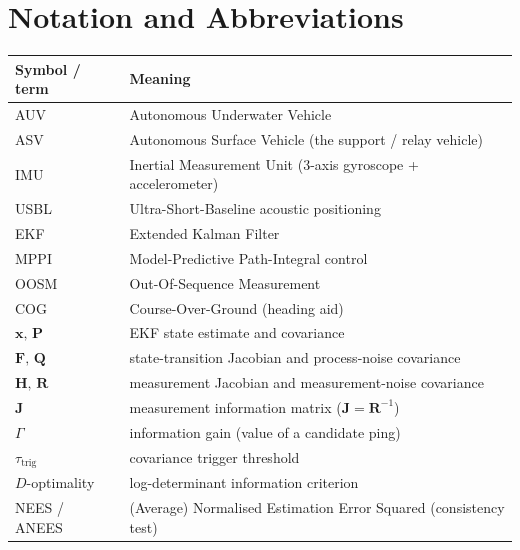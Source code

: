 \documentclass[12pt,a4paper,oneside]{book}
\begin{document}
{\hypersetup{linkcolor=black} \tableofcontents}
{\hypersetup{linkcolor=black} \listoffigures}
{\hypersetup{linkcolor=black} \listoftables}

\chapter*{\centering Notation and Abbreviations}
\begin{center}
\begin{tabular}{@{}ll@{}}
\toprule
Symbol / term & Meaning \\
\midrule
AUV & Autonomous Underwater Vehicle \\
ASV & Autonomous Surface Vehicle (the support / relay vehicle) \\
IMU & Inertial Measurement Unit (3-axis gyroscope + accelerometer) \\
USBL & Ultra-Short-Baseline acoustic positioning \\
EKF & Extended Kalman Filter \\
MPPI & Model-Predictive Path-Integral control \\
OOSM & Out-Of-Sequence Measurement \\
COG & Course-Over-Ground (heading aid) \\
$\mathbf{x},\,\mathbf{P}$ & EKF state estimate and covariance \\
$\mathbf{F},\,\mathbf{Q}$ & state-transition Jacobian and process-noise covariance \\
$\mathbf{H},\,\mathbf{R}$ & measurement Jacobian and measurement-noise covariance \\
$\mathbf{J}$ & measurement information matrix ($\mathbf{J}=\mathbf{R}^{-1}$) \\
$\Gamma$ & information gain (value of a candidate ping) \\
$\tau_{\text{trig}}$ & covariance trigger threshold \\
$D$-optimality & log-determinant information criterion \\
NEES / ANEES & (Average) Normalised Estimation Error Squared (consistency test) \\
\bottomrule
\end{tabular}
\end{center}

\mainmatter

\end{document}
